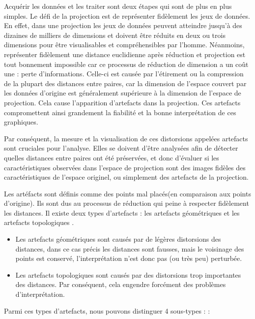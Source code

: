 Acquérir les données et les traiter sont deux étapes qui sont de plus en plus simples. Le défi de la projection est de représenter fidèlement les jeux de données. En effet, dans une projection les jeux de données peuvent atteindre jusqu’à des dizaines de milliers de dimensions et doivent être réduits en deux ou trois dimensions pour être visualisables et compréhensibles par l’homme. 
Néanmoins, représenter fidèlement une distance euclidienne après réduction et projection est tout bonnement impossible car ce processus de réduction de dimension a un coût une : perte d’informations.
Celle-ci est causée par l'étirement ou la compression de la plupart des distances entre paires, car la dimension de l'espace couvert par les données d'origine est généralement supérieure à la dimension de l'espace de projection. Cela cause l’apparition d’artefacts dans la projection. 
Ces artefacts compromettent ainsi grandement la fiabilité et la bonne interprétation de ces graphiques\cite{scarlet}. 


Par conséquent, la mesure et la visualisation de ces distorsions appelées artefacts sont cruciales pour l'analyse. Elles se doivent d'être analysées afin de détecter quelles distances entre paires ont été préservées, 
et donc d'évaluer si les caractéristiques observées dans l'espace de projection sont des images fidèles des caractéristiques de l'espace originel, ou simplement des artefacts de la projection.
\medskip

Les artéfacts sont définis comme des points mal placés(en comparaison aux points d’origine). Ils sont dus au processus de réduction qui peine à respecter fidèlement les distances. Il existe deux types d’artefacts : les artefacts géométriques et les artefacts topologiques \cite{HeulotAnEvaluation}.
\begin{itemize}
    \item Les artefacts géométriques sont causés par de légères distorsions des distances, dans ce cas précis les distances sont fausses, mais le voisinage des points est conservé,  l’interprétation n’est donc pas (ou très peu) perturbée.
    \item Les artefacts topologiques sont causés par des distorsions trop importantes des distances. Par conséquent, cela engendre forcément des problèmes d’interprétation.
\end{itemize}

Parmi ces types d'artefacts, nous pouvons distinguer 4 sous-types :\cite{aupetit2007visualizing} :

